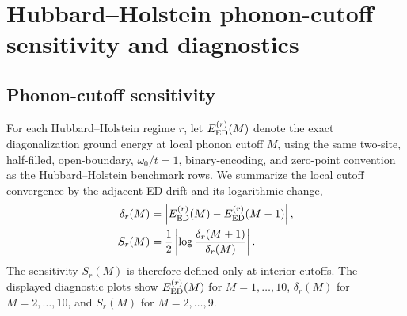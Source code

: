 \documentclass[
  reprint,
  amsmath,
  amssymb,
  aps,
  pra,
  nofootinbib,
  superscriptaddress,
  floatfix
]{revtex4-2}
\begin{document}
\clearpage

\section{Hubbard--Holstein phonon-cutoff sensitivity and diagnostics}
\label{app:hh_stress_diagnostics}

\subsection{Phonon-cutoff sensitivity}
\label{app:hh_cutoff_sensitivity}

For each Hubbard--Holstein regime \(r\), let \(E_{\rm ED}^{(r)}(M)\) denote the
exact diagonalization ground energy at local phonon cutoff \(M\), using the same
two-site, half-filled, open-boundary, \(\omega_0/t=1\), binary-encoding, and
zero-point convention as the Hubbard--Holstein benchmark rows. We summarize
the local cutoff convergence by the adjacent ED drift and its logarithmic
change,
\begin{align*}
\delta_r(M)
&=\left|E_{\rm ED}^{(r)}(M)-E_{\rm ED}^{(r)}(M-1)\right|,\\
S_r(M)
&=\frac{1}{2}\left|\log\frac{\delta_r(M+1)}{\delta_r(M)}\right|.
\end{align*}
The sensitivity \(S_r(M)\) is therefore defined only at interior cutoffs. The
displayed diagnostic plots show \(E_{\rm ED}^{(r)}(M)\) for \(M=1,\ldots,10\),
\(\delta_r(M)\) for \(M=2,\ldots,10\), and \(S_r(M)\) for \(M=2,\ldots,9\).
\end{document}

